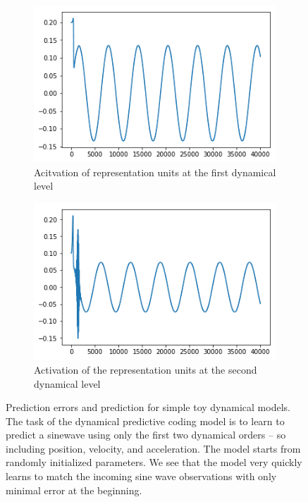 \begin{figure}[H]
\bigskip
\begin{subfigure}{.3\linewidth}
    \centering
    \includegraphics[scale=0.5]{chapter_3_figures/dynamics_sine_wave_thetaz1.png}
    \caption{Acitvation of representation units at the first dynamical level}
\end{subfigure}
   \hfill
\begin{subfigure}{.3\linewidth}
    \centering
    \includegraphics[scale=0.5]{chapter_3_figures/dynamics_sine_wave_theta_z2.png}
    \caption{Activation of the representation units at the second dynamical level}\label{fig:image13}
\end{subfigure}
\caption{Prediction errors and prediction for simple toy dynamical models. The task of the dynamical predictive coding model is to learn to predict a sinewave using only the first two dynamical orders -- so including position, velocity, and acceleration. The model starts from randomly initialized parameters. We see that the model very quickly learns to match the incoming sine wave observations with only minimal error at the beginning.}
\end{figure}


